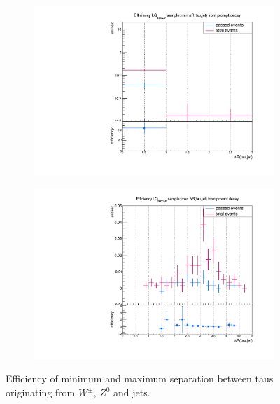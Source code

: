 \begin{figure}
\begin{subfigure}[t]{0.49\textwidth}
                \label{dRprompt:signal:taujet:maxLQ75}
                \end{subfigure}
                \begin{subfigure}[t]{0.49\textwidth}
                \includegraphics[width=\textwidth]{figures/plots/LQ76/Divided_pr_mindR_taujet.pdf}
                \label{dRprompt:signal:taujet:minLQ76}
                \end{subfigure}
                \begin{subfigure}[t]{0.49\textwidth}
                \includegraphics[width=\textwidth]{figures/plots/LQ76/Divided_maxdR_pr_taujet.pdf}
                \label{dRprompt:signal:taujet:maxLQ76}
                \end{subfigure}
\caption[Efficiency of separation between taus originating from $W^\pm$, $Z^0$ and jets.]{Efficiency of minimum and maximum separation between taus originating from $W^\pm$, $Z^0$ and jets.}
\label{dRprompt:signal:taujet}
\end{figure}
